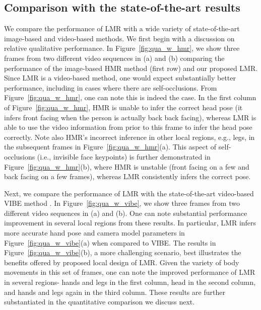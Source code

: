 \documentclass[10pt,twocolumn,letterpaper]{article}
\begin{document}
\subsection{Comparison with the state-of-the-art results} 
We compare the performance of LMR with a wide variety of state-of-the-art image-based and video-based methods. We first begin with a discussion on relative qualitative performance. In Figure~\ref{fig:qua_w_hmr}, we show three frames from two different video sequences in (a) and (b) comparing the performance of the image-based HMR method \cite{hmrKanazawa17} (first row) and our proposed LMR. Since LMR is a video-based method, one would expect substantially better performance, including in cases where there are self-occlusions. From Figure~\ref{fig:qua_w_hmr}, one can note this is indeed the case. In the first column of Figure~\ref{fig:qua_w_hmr}, HMR is unable to infer the correct head pose (it infers front facing when the person is actually back back facing), whereas LMR is able to use the video information from prior to this frame to infer the head pose correctly. Note also HMR's incorrect inference in other local regions, e.g., legs, in the subsequent frames in Figure~\ref{fig:qua_w_hmr}(a). This aspect of self-occlusions (i.e., invisible face keypoints) is further demonstrated in Figure~\ref{fig:qua_w_hmr}(b), where HMR is unstable (front facing on a few and back facing on a few frames), whereas LMR consistently infers the correct pose. 

Next, we compare the performance of LMR with the state-of-the-art video-based VIBE method \cite{kocabas2019vibe}. In Figure~\ref{fig:qua_w_vibe}, we show three frames from two different video sequences in (a) and (b). One can note substantial performance improvement in several local regions from these results. In particular, LMR infers more accurate hand pose and camera model parameters in Figure~\ref{fig:qua_w_vibe}(a) when compared to VIBE. The results in Figure~\ref{fig:qua_w_vibe}(b), a more challenging scenario, best illustrates the benefits offered by proposed local design of LMR. Given the variety of body movements in this set of frames, one can note the improved performance of LMR in several regions- hands and legs in the first column, head in the second column, and hands and legs again in the third column. These results are further substantiated in the quantitative comparison we discuss next. 
\end{document}
